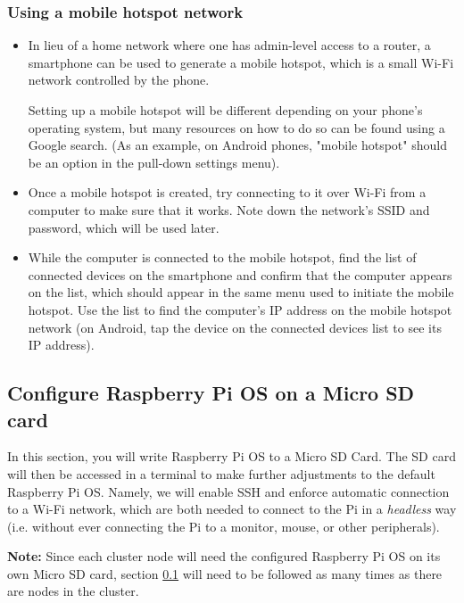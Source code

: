\documentclass{article}
\begin{document}
\subsubsection{Using a mobile hotspot network}
\begin{itemize}
    \item In lieu of a home network where one has admin-level access to a router, a smartphone can be used to generate a mobile hotspot, which is a small Wi-Fi network controlled by the phone.
    
    Setting up a mobile hotspot will be different depending on your phone's operating system, but many resources on how to do so can be found using a Google search. (As an example, on Android phones, "mobile hotspot" should be an option in the pull-down settings menu). 
    
    \item Once a mobile hotspot is created, try connecting to it over Wi-Fi from a computer to make sure that it works.  Note down the network's SSID and password, which will be used later. 
    
    \item While the computer is connected to the mobile hotspot, find the list of connected devices on the smartphone and confirm that the computer appears on the list, which should appear in the same menu used to initiate the mobile hotspot. Use the list to find the computer's IP address on the mobile hotspot network (on Android, tap the device on the connected devices list to see its IP address).
\end{itemize}
	
\subsection{Configure Raspberry Pi OS on a Micro SD card}
\label{sec:configure-os}
In this section, you will write Raspberry Pi OS to a Micro SD Card. The SD card will then be accessed in a terminal to make further adjustments to the default Raspberry Pi OS. Namely, we will enable SSH and enforce automatic connection to a Wi-Fi network, which are both needed to connect to the Pi in a \emph{headless} way (i.e. without ever connecting the Pi to a monitor, mouse, or other peripherals).

\textbf{Note:} Since each cluster node will need the configured Raspberry Pi OS on its own Micro SD card, section \ref{sec:configure-os} will need to be followed as many times as there are nodes in the cluster.
\end{document}
